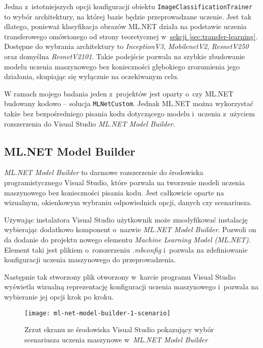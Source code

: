Jedna z~istotniejszych opcji konfiguracji obiektu \lstinline{ImageClassificationTrainer} to wybór architektury, na której bazie będzie przeprowadzane uczenie.
Jest tak dlatego, ponieważ klasyfikacja obrazów ML.NET działa na podstawie uczenia transferowego omówionego od strony teoretycznej w~\hyperref[sec:transfer-learning]{sekcji \ref*{sec:transfer-learning}}.
Dostępne do wybrania architektury to \emph{InceptionV3}, \emph{MobilenetV2}, \emph{ResnetV250} oraz domyślna \emph{ResnetV2101}.
Takie podejście pozwala na szybkie zbudowanie modelu uczenia maszynowego bez konieczności głębokiego zrozumienia jego działania, skupiając się wyłącznie na oczekiwanym celu.

W ramach mojego badania jeden z~projektów jest oparty o~czy ML.NET budowany kodowo -- solucja \lstinline{MLNetCustom}.
Jednak ML.NET można wykorzystać także bez bezpośredniego pisania kodu dotyczącego modelu i~uczenia z~użyciem rozszerzenia do Visual Studio \emph{ML.NET Model Builder}.

\subsection{ML.NET Model Builder}
\label{sec:ml-net-model-builder}

\emph{ML.NET Model Builder} to darmowe rozszerzenie do środowiska programistycznego Visual Studio, które pozwala na tworzenie modeli uczenia maszynowego bez konieczności pisania kodu.
Jest całkowicie oparte na wizualnym, okienkowym wybraniu odpowiednich opcji, danych czy scenariusza.

Używając instalatora Visual Studio użytkownik może zmodyfikować instalację wybierając dodatkowo komponent o~nazwie \emph{ML.NET Model Builder}.
Pozwoli on da dodanie do projektu nowego elementu \emph{Machine Learning Model (ML.NET)}.
Element taki jest plikiem o~rozszerzeniu \emph{.mbconfig} i~pozwala na zdefiniowanie konfiguracji uczenia maszynowego do przeprowadzenia.

Następnie tak stworzony plik otworzony w~karcie programu Visual Studio wyświetla wizualną reprezentację konfiguracji uczenia maszynowego i~pozwala na wybieranie jej opcji krok po kroku.

\begin{figure}[ht]
  \texttt{[image: ml-net-model-builder-1-scenario]}
  \caption{Zrzut ekranu ze środowiska Visual Studio pokazujący wybór scenariusza uczenia maszynowe w~\emph{ML.NET Model Builder}}
  \label{fig:ml-net-model-builder-1-scenario}
\end{figure}

